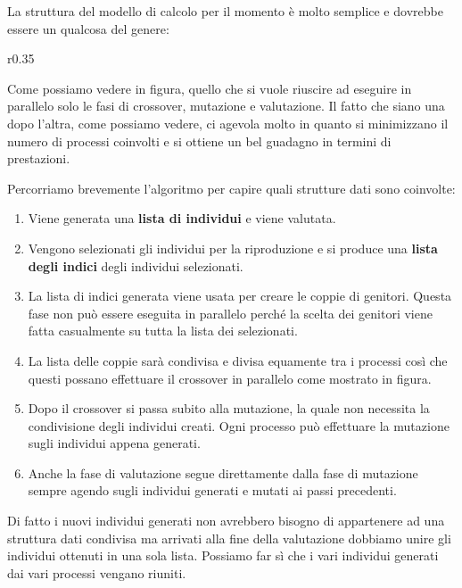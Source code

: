 La struttura del modello di calcolo per il momento è molto semplice e dovrebbe
essere un qualcosa del genere:

\begin{wrapfigure}{r}{0.35\textwidth}
	
\end{wrapfigure}

Come possiamo vedere in figura, quello che si vuole riuscire ad eseguire in
parallelo solo le fasi di crossover, mutazione e valutazione. Il fatto che
siano una dopo l'altra, come possiamo vedere, ci agevola molto in quanto si
minimizzano il numero di processi coinvolti e si ottiene un bel guadagno in
termini di prestazioni.

Percorriamo brevemente l'algoritmo per capire quali strutture dati sono
coinvolte:
\begin{enumerate}
	\item Viene generata una \textbf{lista di individui} e viene valutata.
	\item Vengono selezionati gli individui per la riproduzione e si produce
	      una \textbf{lista degli indici} degli individui selezionati.
	\item La lista di indici generata viene usata per creare le coppie di
	      genitori. Questa fase non può essere eseguita in parallelo perché
	      la scelta dei genitori viene fatta casualmente su tutta la lista
	      dei selezionati.
\end{enumerate}

\begin{enumerate}
	\setcounter{enumi}{3}
	\item La lista delle coppie sarà condivisa e divisa equamente tra i
	      processi così che questi possano effettuare il crossover in parallelo
	      come mostrato in figura.
	\item Dopo il crossover si passa subito alla mutazione, la quale non
	      necessita la condivisione degli individui creati. Ogni processo può
	      effettuare la mutazione sugli individui appena generati.
	\item Anche la fase di valutazione segue direttamente dalla fase di
	      mutazione sempre agendo sugli individui generati e mutati ai passi
	      precedenti.
\end{enumerate}
Di fatto i nuovi individui generati non avrebbero bisogno di appartenere ad una
struttura dati condivisa ma arrivati alla fine della valutazione dobbiamo unire
gli individui ottenuti in una sola lista. Possiamo far sì che i vari individui
generati dai vari processi vengano riuniti.